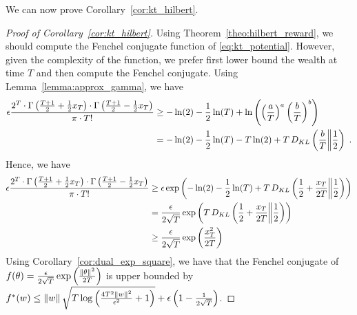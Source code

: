 We can now prove Corollary~\ref{cor:kt_hilbert}.
\begin{proof}[Proof of Corollary~\ref{cor:kt_hilbert}]
Using Theorem~\ref{theo:hilbert_reward}, we should compute the Fenchel conjugate function of \eqref{eq:kt_potential}.
However, given the complexity of the function, we prefer first lower bound the wealth at time $T$ and then compute the Fenchel conjugate.
Using Lemma~\ref{lemma:approx_gamma}, we have
\begin{align*}
\epsilon  \frac{2^T \cdot \Gamma \left(\frac{T+1}{2} + \frac{1}{2} x_{T} \right) \cdot \Gamma \left(\frac{T+1}{2} - \frac{1}{2} x_{T} \right)}{\pi \cdot T!} 
&\geq -\ln(2) -\frac{1}{2} \ln(T) +\ln \left(\left( \frac{a}{T} \right)^a \left( \frac{b}{T} \right)^b\right) \\
&= -\ln(2) -\frac{1}{2} \ln(T) -T \ln (2) + T \, D_{KL}\left(\frac{b}{T}\middle\|\frac{1}{2}\right) \; .
\end{align*}
Hence, we have
\begin{align*}
\epsilon  \frac{2^T \cdot \Gamma \left(\frac{T+1}{2} + \frac{1}{2} x_{T} \right) \cdot \Gamma \left(\frac{T+1}{2} - \frac{1}{2} x_{T} \right)}{\pi \cdot T!} 
&\geq \epsilon \exp\left(-\ln(2) -\frac{1}{2} \ln(T) + T \, D_{KL}\left(\frac{1}{2}+\frac{x_T}{2T}\middle\|\frac{1}{2}\right)\right) \\
&= \frac{\epsilon}{2 \sqrt{T}} \exp\left(T \, D_{KL}\left(\frac{1}{2}+\frac{x_T}{2T}\middle\|\frac{1}{2}\right)\right) \\
&\geq \frac{\epsilon}{2 \sqrt{T}} \exp\left(\frac{x_T^2}{2T}\right)
\end{align*}
Using Corollary~\ref{cor:dual_exp_square}, we have that the Fenchel conjugate of $f(\theta)=\frac{\epsilon}{2\sqrt{T}} \exp\left(\frac{\left\|{\theta}\right\|^2}{2 T}\right)$ is upper bounded by $f^*(w) \leq \left\|{w}\right\| \sqrt{T \log \left(\frac{4 T^2 \left\|{w}\right\|^2}{\epsilon^2} +1 \right)}+\epsilon\left(1-\frac{1}{2\sqrt{T}}\right)$.
\end{proof}


